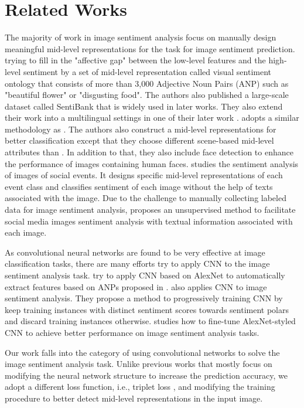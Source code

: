 \section{Related Works}
\label{relatedwork} 

The majority of work in image sentiment analysis focus on manually design meaningful mid-level representations for the task for image sentiment prediction. \cite{borth2013large} trying to fill in the "affective gap" between the low-level features and the high-level sentiment by a set of mid-level representation called visual sentiment ontology that consists of more than 3,000 Adjective Noun Pairs (ANP) such as "beautiful flower" or "disgusting food". The authors also published a large-scale dataset called SentiBank that is widely used in later works. They also extend their work into a multilingual settings in one of their later work \cite{jou2015visual}. \cite{yuan2013sentribute} adopts a similar methodology as \cite{borth2013large}. The authors also construct a mid-level representations for better classification except that they choose different scene-based mid-level attributes than \cite{borth2013large}. In addition to that, they also include face detection to enhance the performance of images containing human faces. \cite{ahsan2017towards} studies the sentiment analysis of images of social events. It designs specific mid-level representations of each event class and classifies sentiment of each image without the help of texts associated with the image. Due to the challenge to manually collecting labeled data for image sentiment analysis, \cite{wang2015unsupervised} proposes an unsupervised method to facilitate social media images sentiment analysis with textual information associated with each image.

As convolutional neural networks are found to be very effective at image classification tasks, there are many efforts try to apply CNN to the image sentiment analysis task. \cite{chen2014deepsentibank} try to apply CNN based on AlexNet \cite{krizhevsky2012imagenet} to automatically extract features based on ANPs proposed in \cite{borth2013large}. \cite{you2015robust} also applies CNN to image sentiment analysis. They propose a method to progressively training CNN by keep training instances with distinct sentiment scores towards sentiment polars and discard training instances otherwise. \cite{campos2017pixels} studies how to fine-tune AlexNet-styled CNN to achieve better performance on image sentiment analysis tasks. 

Our work falls into the category of using convolutional networks to solve the image sentiment analysis task. Unlike previous works that mostly focus on modifying the neural network structure to increase the prediction accuracy, we adopt a different loss function, i.e., triplet loss \cite{hermans2017defense}, and modifying the training procedure to better detect mid-level representations in the input image.


